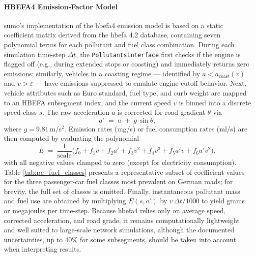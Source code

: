 \paragraph{HBEFA4 Emission‐Factor Model}  
\ac{sumo}’s implementation of the \ac{hbefa}4 emission model \cite{Krajzewicz2002} is based on a static coefficient matrix derived from the \ac{hbefa} 4.2 database, containing seven polynomial terms for each pollutant and fuel class combination. During each simulation time‐step $\Delta t$, the \texttt{PollutantsInterface} first checks if the engine is flagged off (e.g., during extended stops or coasting) and immediately returns zero emissions; similarly, vehicles in a coasting regime --- identified by $a < a_{\mathrm{coast}}(v)$ and $v>\varepsilon$ --- have emissions suppressed to emulate engine‐cutoff behavior.  Next, vehicle attributes such as Euro standard, fuel type, and curb weight are mapped to an HBEFA subsegment index, and the current speed $v$ is binned into a discrete speed class $s$.  The raw acceleration $a$ is corrected for road gradient $\theta$ via  
\[
  a' \;=\; a \;+\; g\,\sin\theta,
\]  
where $g=9.81\,$m/s$^2$.  Emission rates (mg/s) or fuel consumption rates (ml/s) are then computed by evaluating the polynomial  
\[
  E \;=\;\frac{1}{\mathrm{scale}}\bigl(f_0 + f_1 v + f_2 a' + f_3 v^2 + f_4 v^3 + f_5 a'v + f_6 a'v^2\bigr),
\]  
with all negative values clamped to zero (except for electricity consumption). Table \ref{tab:pc_fuel_classes} presents a representative subset of coefficient values for the three passenger-car fuel classes most prevalent on German roads; for brevity, the full set of classes is omitted. Finally, instantaneous pollutant mass and fuel use are obtained by multiplying $E(s,a')$ by $v\,\Delta t/1000$ to yield grams or megajoules per time‐step. Because \ac{hbefa}4 relies only on average speed, corrected acceleration, and road grade, it remains computationally lightweight and well suited to large‐scale network simulations, although the documented uncertainties, up to 40\% for some subsegments, should be taken into account when interpreting results. \cite{SUMO_HBEFA4}

